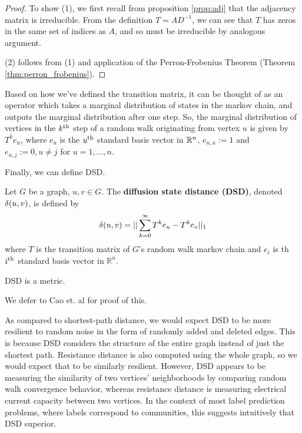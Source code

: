 \begin{proof}
  To show (1), we first recall from proposition \ref{prop:adj} that the adjacency matrix is
  irreducible. From the definition $T = AD^{-1}$, we can see that $T$ has zeros in the same set of
  indices as $A$, and so must be irreducible by analogous argument.

  (2) follows from (1) and application of the Perron-Frobenius Theorem (Theorem
  \ref{thm:perron_frobenius}).
\end{proof}

Based on how we've defined the transition matrix, it can be thought of as an operator which takes a
marginal distribution of states in the markov chain, and outputs the marginal distribution after one
step. So, the marginal distribution of vertices in the $k^{\mathrm{th}}$ step of a random walk originating
from vertex $u$ is given by $T^ke_u$, where $e_u$ is the $u^{\mathrm{th}}$ standard basis vector in $\mathbb{R}^n$,
$e_{u,u} := 1$ and $e_{u,j} := 0, u \neq j$ for $u=1,...,n$.

Finally, we can define DSD.

\begin{definition}
  Let $G$ be a graph, $u,v \in G$. The \textbf{diffusion state distance (DSD)}, denoted $\delta(u,v)$,
  is defined by
  \[
    \delta(u,v) = ||\sum_{k =0}^{\infty}{T^ke_u - T^ke_v}||_1
  \]
  where $T$ is the transition matrix of $G$'s random walk markov chain and $e_i$ is th $i^{\mathrm{th}}$
  standard basis vector in $\mathbb{R}^n$.
\end{definition}

\begin{theorem}
  DSD is a metric.
\end{theorem}

We defer to Cao et. al for proof of this.

As compared to shortest-path distance, we would expect DSD to be more resilient to random noise in
the form of randomly added and deleted edges. This is because DSD considers the structure of the
entire graph instead of just the shortest path. Resistance distance is also computed using the whole
graph, so we would expect that to be similarly resilient. However, DSD appears to be measuring the
similarity of two vertices' neighborhoods by comparing random walk convergence behavior, whereas
resistance distance is measuring electrical current capacity between two vertices. In the context of
most label prediction problems, where labels correspond to communities, this suggests intuitively
that DSD superior.


